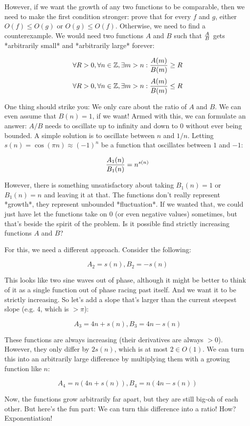 \documentclass[11pt]{amsart}
\begin{document}
However, if we want the growth of any two functions to be comparable, then we need to make the first condition stronger: prove that for every $f$ and $g$, either $O(f) \leq O(g)$ or $O(g) \leq O(f)$. Otherwise, we need to find a counterexample. We would need two functions $A$ and $B$ such that ${A \over B}$ gets *arbitrarily small* and *arbitrarily large* forever:

$$\forall R>0, \forall n\in\mathbb{Z}, \exists m>n: {A(m) \over B(m)} \geq R$$
$$\forall R>0, \forall n\in\mathbb{Z}, \exists m>n: {A(m) \over B(m)} \leq R$$

One thing should strike you: We only care about the ratio of $A$ and $B$. We can even assume that $B(n) = 1$, if we want! Armed with this, we can formulate an answer: $A/B$ needs to oscillate up to infinity and down to $0$ without ever being bounded. A simple solution is to oscillate between $n$ and $1/n$. Letting $s(n) = \cos(\pi n) \approx (-1)^n$ be a function that oscillates between $1$ and $-1$:

$${A_1(n) \over B_1(n)} = n^{s(n)}$$

However, there is something unsatisfactory about taking $B_1(n) = 1$ or $B_1(n) = n$ and leaving it at that. The functions don't really represent *growth*, they represent unbounded *fluctuation*. If we wanted that, we could just have let the functions take on $0$ (or even negative values) sometimes, but that's beside the spirit of the problem. Is it possible find strictly increasing functions $A$ and $B$?

For this, we need a different approach. Consider the following:

$$A_2 = s(n), B_2 = -s(n)$$

This looks like two sine waves out of phase, although it might be better to think of it as a single function out of phase racing past itself. And we want it to be strictly increasing. So let's add a slope that's larger than the current steepest slope (e.g. $4$, which is $> \pi$):

$$A_3 = 4n+s(n), B_3 = 4n-s(n)$$

These functions are always increasing (their derivatives are always $>0$). However, they only differ by $2 s(n)$, which is at most $2 \in O(1)$. We can turn this into an arbitrarily large difference by multiplying them with a growing function like $n$:

$$A_4 = n \left(4n + s(n)\right), B_4 = n \left(4n - s(n)\right)$$

Now, the functions grow arbitrarily far apart, but they are still big-oh of each other. But here's the fun part: We can turn this difference into a ratio! How? Exponentiation!
\end{document}
